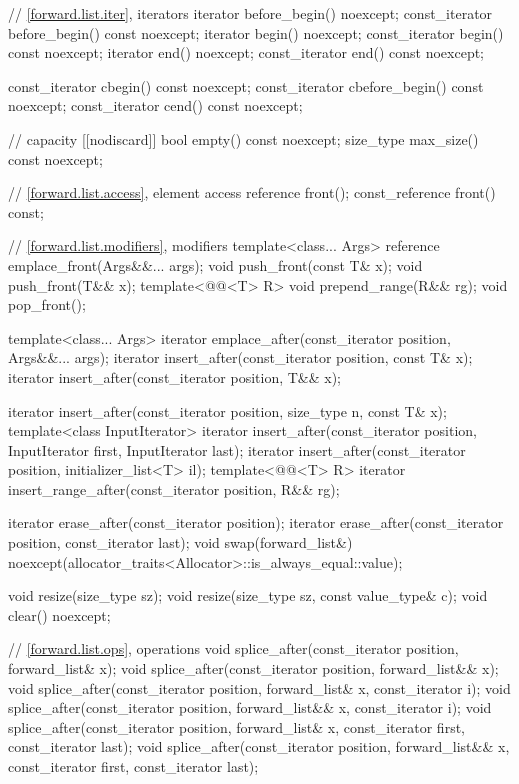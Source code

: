 \begin{codeblock}
{{    // \ref{forward.list.iter}, iterators
    iterator before_begin() noexcept;
    const_iterator before_begin() const noexcept;
    iterator begin() noexcept;
    const_iterator begin() const noexcept;
    iterator end() noexcept;
    const_iterator end() const noexcept;

    const_iterator cbegin() const noexcept;
    const_iterator cbefore_begin() const noexcept;
    const_iterator cend() const noexcept;

    // capacity
    [[nodiscard]] bool empty() const noexcept;
    size_type max_size() const noexcept;

    // \ref{forward.list.access}, element access
    reference front();
    const_reference front() const;

    // \ref{forward.list.modifiers}, modifiers
    template<class... Args> reference emplace_front(Args&&... args);
    void push_front(const T& x);
    void push_front(T&& x);
    template<@@<T> R>
      void prepend_range(R&& rg);
    void pop_front();

    template<class... Args> iterator emplace_after(const_iterator position, Args&&... args);
    iterator insert_after(const_iterator position, const T& x);
    iterator insert_after(const_iterator position, T&& x);

    iterator insert_after(const_iterator position, size_type n, const T& x);
    template<class InputIterator>
      iterator insert_after(const_iterator position, InputIterator first, InputIterator last);
    iterator insert_after(const_iterator position, initializer_list<T> il);
    template<@@<T> R>
      iterator insert_range_after(const_iterator position, R&& rg);

    iterator erase_after(const_iterator position);
    iterator erase_after(const_iterator position, const_iterator last);
    void swap(forward_list&)
      noexcept(allocator_traits<Allocator>::is_always_equal::value);

    void resize(size_type sz);
    void resize(size_type sz, const value_type& c);
    void clear() noexcept;

    // \ref{forward.list.ops},  operations
    void splice_after(const_iterator position, forward_list& x);
    void splice_after(const_iterator position, forward_list&& x);
    void splice_after(const_iterator position, forward_list& x, const_iterator i);
    void splice_after(const_iterator position, forward_list&& x, const_iterator i);
    void splice_after(const_iterator position, forward_list& x,
                      const_iterator first, const_iterator last);
    void splice_after(const_iterator position, forward_list&& x,
                      const_iterator first, const_iterator last);

}}
\end{codeblock}
